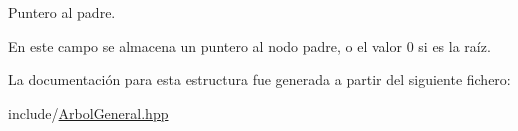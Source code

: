 Puntero al padre. 

En este campo se almacena un puntero al nodo padre, o el valor 0 si es la raíz. 

La documentación para esta estructura fue generada a partir del siguiente fichero\-:\begin{DoxyCompactItemize}
\item 
include/\hyperlink{ArbolGeneral_8hpp}{Arbol\-General.\-hpp}\end{DoxyCompactItemize}

